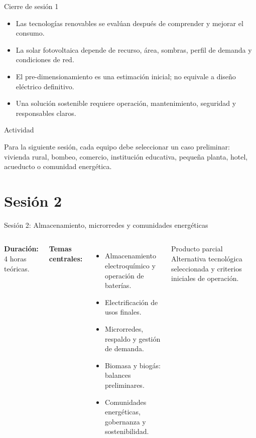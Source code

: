\documentclass[aspectratio=169,10pt]{beamer}
\newcommand{\actividad}[1]{
\begin{alertblock}{Actividad}
#1
\end{alertblock}
}
\begin{document}
\begin{frame}{Cierre de sesión 1}
\begin{itemize}
    \item Las tecnologías renovables se evalúan después de comprender y mejorar el consumo.
    \item La solar fotovoltaica depende de recurso, área, sombras, perfil de demanda y condiciones de red.
    \item El pre-dimensionamiento es una estimación inicial; no equivale a diseño eléctrico definitivo.
    \item Una solución sostenible requiere operación, mantenimiento, seguridad y responsables claros.
\end{itemize}

\actividad{
Para la siguiente sesión, cada equipo debe seleccionar un caso preliminar: vivienda rural, bombeo, comercio, institución educativa, pequeña planta, hotel, acueducto o comunidad energética.
}
\end{frame}

\section{Sesión 2}

\begin{frame}{Sesión 2: Almacenamiento, microrredes y comunidades energéticas}
\begin{columns}
\textbf{Duración:} 4 horas teóricas.

\vspace{0.3cm}

\textbf{Temas centrales:}
\begin{itemize}
    \item Almacenamiento electroquímico y operación de baterías.
    \item Electrificación de usos finales.
    \item Microrredes, respaldo y gestión de demanda.
    \item Biomasa y biogás: balances preliminares.
    \item Comunidades energéticas, gobernanza y sostenibilidad.
\end{itemize}

\begin{block}{Producto parcial}
Alternativa tecnológica seleccionada y criterios iniciales de operación.
\end{block}
\end{columns}
\end{frame}
\end{document}

